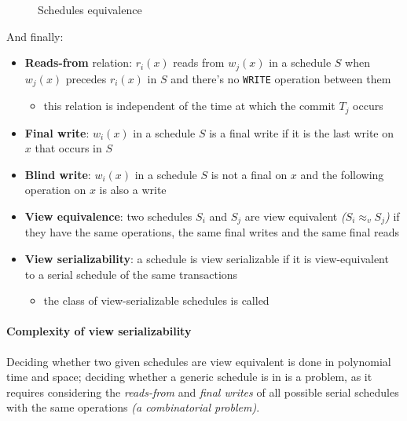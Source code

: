\documentclass[english]{article}
\begin{document}
\begin{figure}[htbp]
  \bigskip
  \centering
  \caption{Schedules equivalence}
  \label{fig:schedules-equivalence}
  \bigskip
\end{figure}

And finally:

\begin{itemize}
  \item \textbf{Reads-from} relation: \(r_i(x)\) reads from \(w_j(x)\) in a schedule \(S\) when \(w_j(x)\) precedes \(r_i(x)\) in \(S\) and there's no \texttt{WRITE} operation between them
        \begin{itemize}
          \item this relation is independent of the time at which the commit \(T_j\) occurs
        \end{itemize}
  \item \textbf{Final write}: \(w_i(x)\) in a schedule \(S\) is a final write if it is the last write on \(x\) that occurs in \(S\)
  \item \textbf{Blind write}: \(w_i(x)\) in a schedule \(S\) is not a final on \(x\) and the following operation on \(x\) is also a write
  \item \textbf{View equivalence}: two schedules \(S_i\) and \(S_j\) are view equivalent \textit{(\(S_i \approx_v S_j\))} if they have the same operations, the same final writes and the same final reads
  \item \textbf{View serializability}: a schedule is view serializable if it is view-equivalent to a serial schedule of the same transactions
        \begin{itemize}
          \item the class of view-serializable schedules is called \VSR
        \end{itemize}
\end{itemize}

\paragraph{Complexity of view serializability}

Deciding whether two given schedules are view equivalent is done in polynomial time and space;
deciding whether a generic schedule is in \VSR is a \NPC problem, as it requires considering the \textit{reads-from} and \textit{final writes} of all possible serial schedules with the same operations \textit{(a combinatorial problem)}.
\end{document}
